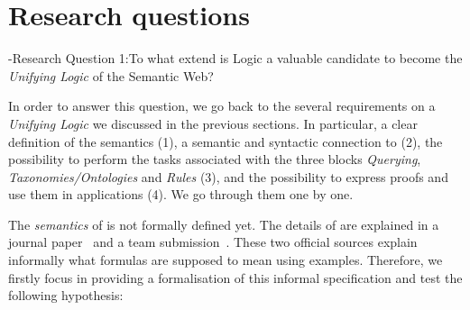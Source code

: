 %
% 
% 
% 
% 
% 
% 
% 
%  

\section{Research questions}



\hyp{Research Question 1:}{To what extend is \nthree Logic a valuable candidate to become the \emph{Unifying Logic} of the Semantic Web?}

In order to answer this question, we go back to the several requirements on a \emph{Unifying Logic} we discussed in the previous sections. 
In particular,
a clear definition of the semantics (1), a semantic and syntactic connection to \rdf (2), the possibility to perform the tasks associated with 
the three blocks \emph{Querying}, \emph{Taxonomies/Ontologies}
and \emph{Rules} (3), and the possibility to express proofs and use them in applications (4). We go through them one by one.

The \emph{semantics} of \nthree is not formally defined yet. The details of \nthreelogic 
are explained in a journal paper~\cite{N3Logic} and a \wwwc team submission~\cite{Notation3}. 
These two official sources explain informally what \nthree formulas are supposed to mean using examples.  Therefore, we firstly focus in providing a formalisation of this informal specification and test the following hypothesis:

